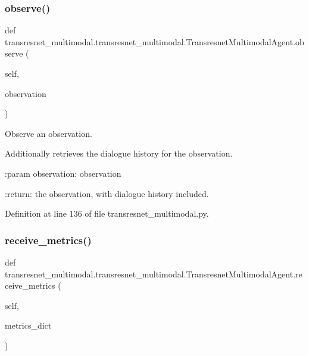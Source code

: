 \subsubsection{\texorpdfstring{observe()}{observe()}}
{\footnotesize\ttfamily def transresnet\+\_\+multimodal.\+transresnet\+\_\+multimodal.\+Transresnet\+Multimodal\+Agent.\+observe (\begin{DoxyParamCaption}\item[{}]{self,  }\item[{}]{observation }\end{DoxyParamCaption})}

\begin{DoxyVerb}Observe an observation.

Additionally retrieves the dialogue history for the observation.

:param observation:
    observation

:return:
    the observation, with dialogue history included.
\end{DoxyVerb}
 

Definition at line 136 of file transresnet\+\_\+multimodal.\+py.

\mbox{\label{classtransresnet__multimodal_1_1transresnet__multimodal_1_1TransresnetMultimodalAgent_ad48a1d1a6a59a8bc2cef782de992af5a}} 
\subsubsection{\texorpdfstring{receive\+\_\+metrics()}{receive\_metrics()}}
{\footnotesize\ttfamily def transresnet\+\_\+multimodal.\+transresnet\+\_\+multimodal.\+Transresnet\+Multimodal\+Agent.\+receive\+\_\+metrics (\begin{DoxyParamCaption}\item[{}]{self,  }\item[{}]{metrics\+\_\+dict }\end{DoxyParamCaption})}

